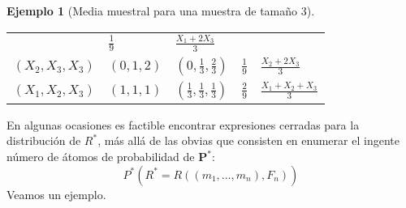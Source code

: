 \documentclass[
]{book}
\theoremstyle{break}
\theoremstyle{definition}
\theoremstyle{definition}
\newtheorem{example}{Ejemplo}[chapter]
\theoremstyle{definition}
\theoremstyle{remark}
\begin{document}
\begin{example}[Media muestral para una muestra de tamaño 3]
\begin{longtable}[]{@{}lllll@{}}
\begin{minipage}[t]{0.16\columnwidth}
\end{minipage} & \begin{minipage}[t]{0.17\columnwidth}\raggedright
\(\frac{1}{9}\)\strut
\end{minipage} & \begin{minipage}[t]{0.18\columnwidth}\raggedright
\(\frac{X_1+2X_3}{3}\)\strut
\end{minipage}\tabularnewline
\begin{minipage}[t]{0.18\columnwidth}\raggedright
\(\left( X_2,X_3,X_3 \right)\)\strut
\end{minipage} & \begin{minipage}[t]{0.16\columnwidth}\raggedright
\(\left( 0,1,2 \right)\)\strut
\end{minipage} & \begin{minipage}[t]{0.16\columnwidth}\raggedright
\(\left( 0,\frac{1}{3},\frac{2}{3} \right)\)\strut
\end{minipage} & \begin{minipage}[t]{0.17\columnwidth}\raggedright
\(\frac{1}{9}\)\strut
\end{minipage} & \begin{minipage}[t]{0.18\columnwidth}\raggedright
\(\frac{X_2+2X_3}{3}\)\strut
\end{minipage}\tabularnewline
\begin{minipage}[t]{0.18\columnwidth}\raggedright
\(\left( X_1,X_2,X_3 \right)\)\strut
\end{minipage} & \begin{minipage}[t]{0.16\columnwidth}\raggedright
\(\left( 1,1,1 \right)\)\strut
\end{minipage} & \begin{minipage}[t]{0.16\columnwidth}\raggedright
\(\left( \frac{1}{3},\frac{1}{3},\frac{1}{3} \right)\)\strut
\end{minipage} & \begin{minipage}[t]{0.17\columnwidth}\raggedright
\(\frac{2}{9}\)\strut
\end{minipage} & \begin{minipage}[t]{0.18\columnwidth}\raggedright
\(\frac{X_1+X_2+X_3}{3}\)\strut
\end{minipage}\tabularnewline
\bottomrule
\end{longtable}
\end{example}

En algunas ocasiones es factible encontrar expresiones cerradas
para la distribución de \(R^{\ast}\), más allá de las obvias que
consisten en enumerar el ingente número de átomos de probabilidad de
\(\mathbf{P}^{\ast}\):
\[P^{\ast}\left( R^{\ast}=R\left( \left( m_1,\ldots ,m_n \right)
,F_n \right) \right)\]
Veamos un ejemplo.
\end{document}
